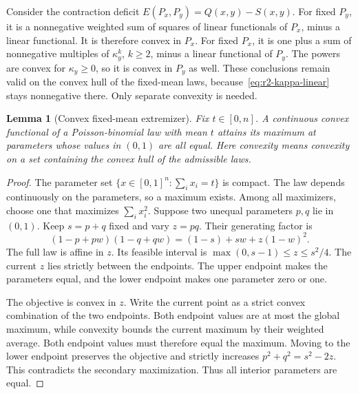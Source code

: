 \documentclass[11pt,a4paper]{article}
\newtheorem{lemma}[theorem]{Lemma}
\theoremstyle{definition}
\theoremstyle{remark}
\begin{document}
Consider the contraction deficit $E(P_x,P_y)=Q(x,y)-S(x,y)$.
For fixed $P_y$, it is a nonnegative weighted sum of squares of linear functionals of $P_x$, minus a linear functional.
It is therefore convex in $P_x$.
For fixed $P_x$, it is one plus a sum of nonnegative multiples of $\kappa_y^k$, $k\ge2$, minus a linear functional of $P_y$.
The powers are convex for $\kappa_y\ge0$, so it is convex in $P_y$ as well.
These conclusions remain valid on the convex hull of the fixed-mean laws, because~\eqref{eq:r2-kappa-linear} stays nonnegative there.
Only separate convexity is needed.

\begin{lemma}[Convex fixed-mean extremizer]\label{lem:r2-convex-extremizer}
Fix $t\in[0,n]$.
A continuous convex functional of a Poisson-binomial law with mean $t$ attains its maximum at parameters whose values in $(0,1)$ are all equal.
Here convexity means convexity on a set containing the convex hull of the admissible laws.
\end{lemma}

\begin{proof}
The parameter set $\{x\in[0,1]^n:\sum_i x_i=t\}$ is compact.
The law depends continuously on the parameters, so a maximum exists.
Among all maximizers, choose one that maximizes $\sum_i x_i^2$.
Suppose two unequal parameters $p,q$ lie in $(0,1)$.
Keep $s=p+q$ fixed and vary $z=pq$.
Their generating factor is
\[
(1-p+pw)(1-q+qw)=(1-s)+sw+z(1-w)^2.
\]
The full law is affine in $z$.
Its feasible interval is $\max(0,s-1)\le z\le s^2/4$.
The current $z$ lies strictly between the endpoints.
The upper endpoint makes the parameters equal, and the lower endpoint makes one parameter zero or one.

The objective is convex in $z$.
Write the current point as a strict convex combination of the two endpoints.
Both endpoint values are at most the global maximum, while convexity bounds the current maximum by their weighted average.
Both endpoint values must therefore equal the maximum.
Moving to the lower endpoint preserves the objective and strictly increases $p^2+q^2=s^2-2z$.
This contradicts the secondary maximization.
Thus all interior parameters are equal.
\end{proof}
\end{document}
